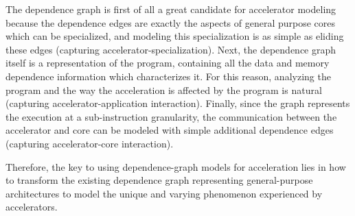 The dependence graph is first of all a great candidate for accelerator modeling
because the dependence edges are exactly the aspects of general purpose cores
which can be specialized, and modeling this specialization is as simple as
eliding these edges (capturing accelerator-specialization).  Next, the
dependence graph itself is a representation of the program, containing all the
data and memory dependence information which characterizes it.  For this
reason, analyzing the program and the way the acceleration is affected by the
program is natural (capturing accelerator-application interaction).  Finally,
since the graph represents the execution at a sub-instruction granularity, the
communication between the accelerator and core can be modeled with simple
additional dependence edges (capturing accelerator-core interaction).

Therefore, 
the key to using dependence-graph models for acceleration lies in how to transform
the existing dependence graph representing general-purpose architectures to 
model the unique and varying phenomenon experienced by accelerators.

